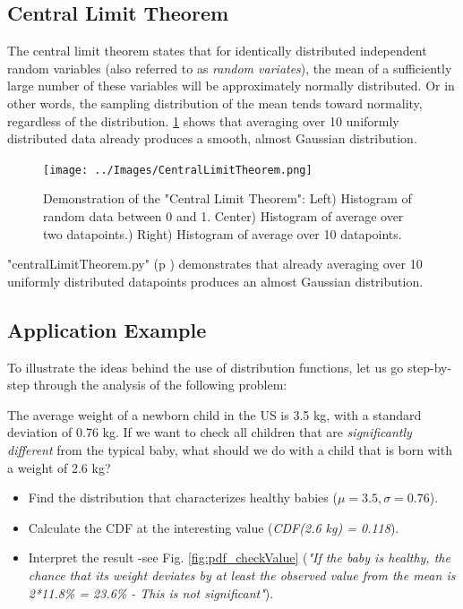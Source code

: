 \subsection{Central Limit Theorem}\label{sec:CentralLimitTheorem}
The central limit theorem states that for identically distributed independent random variables (also referred to as \emph{random variates}), the mean of a sufficiently large number of these variables will be approximately normally distributed. Or in other words, the sampling distribution of the mean tends toward normality, regardless of the distribution.
\ref{fig:CentralLimitTheorem} shows that averaging over 10 uniformly distributed data already produces a smooth, almost Gaussian distribution.

\begin{figure}
  \centering
  \texttt{[image: ../Images/CentralLimitTheorem.png]}\\
  \caption{Demonstration of the "Central Limit Theorem": Left) Histogram of random data between 0 and 1. Center) Histogram of average over two datapoints.) Right) Histogram of average over 10 datapoints.}\label{fig:CentralLimitTheorem}
\end{figure}

\PyImg "centralLimitTheorem.py" (p \pageref{py:centralLimitTheorem}) demonstrates that already averaging over 10 uniformly distributed datapoints produces an almost Gaussian distribution.

\subsection{Application Example}

To illustrate the ideas behind the use of distribution functions, let us go step-by-step through the analysis of the following problem:

The average weight of a newborn child in the US is 3.5 kg, with a standard deviation of 0.76 kg. If we want to check all children that are \emph{significantly different} from the typical baby, what should we do with a child that is born with a weight of 2.6 kg?

\begin{itemize}
  \item Find the distribution that characterizes healthy babies ($\mu=3.5, \sigma=0.76$).
  \item Calculate the CDF at the interesting value (\emph{CDF(2.6 kg) = 0.118}).
  \item Interpret the result -see Fig. \ref{fig:pdf_checkValue} (\emph{"If the baby is healthy, the chance that its weight deviates by at least the observed value from the mean is 2*11.8\% = 23.6\% - This is not significant"}).
\end{itemize}

